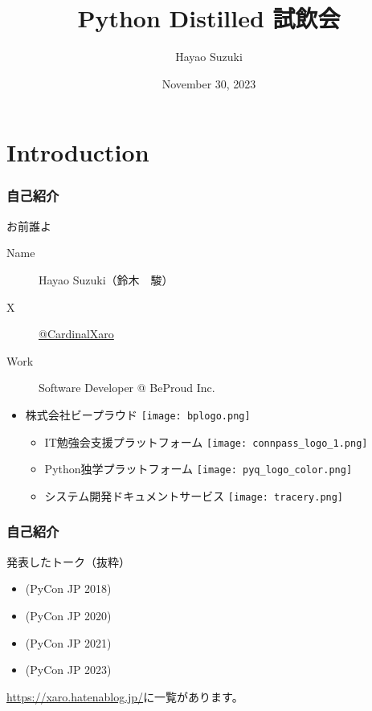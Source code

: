 \documentclass[aspectratio=169,dvipdfmx,12pt,notheorems]{beamer}
\title{Python Distilled 試飲会}
\author[Hayao]{Hayao Suzuki}
\institute[BPStudy \#195]{BPStudy \#195}
\date{November 30, 2023}
\theoremstyle{definition}
\begin{document}
\begin{frame}[plain]\frametitle{}
\titlepage %
\end{frame}


\section{Introduction}

\begin{frame}\frametitle{自己紹介}

\begin{block}{お前誰よ}
\begin{description}
\item[Name] Hayao Suzuki（鈴木　駿）
\item[ X] \href{https://twitter.com/CardinalXaro}{@CardinalXaro}
\item[Work] Software Developer @ BeProud Inc.
\end{description}
\end{block}

\begin{center}
\begin{itemize}
\item 株式会社ビープラウド \texttt{[image: bplogo.png]} 
\begin{itemize}
\item IT勉強会支援プラットフォーム \texttt{[image: connpass\_logo\_1.png]}
\item Python独学プラットフォーム \texttt{[image: pyq\_logo\_color.png]} 
\item システム開発ドキュメントサービス \texttt{[image: tracery.png]} 
\end{itemize}
\end{itemize}
\end{center}

\end{frame}

\begin{frame}\frametitle{自己紹介}

\begin{block}{発表したトーク（抜粋）}
\begin{itemize}
\item {}(PyCon JP 2018)
\item {}(PyCon JP 2020)
\item {}(PyCon JP 2021)
\item {}(PyCon JP 2023)
\end{itemize}
\end{block}
\url{https://xaro.hatenablog.jp/}に一覧があります。
\end{frame}
\end{document}
